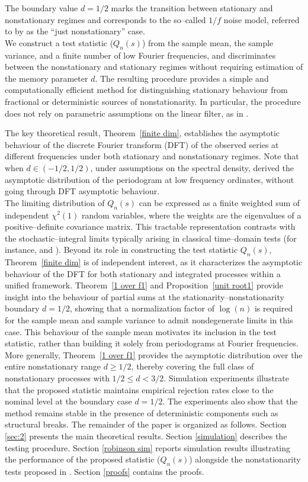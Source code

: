 \documentclass[10pt,a4paper]{amsart}
\numberwithin{equation}{section}
\begin{document}
The boundary value $d=1/2$ marks the transition between stationary and nonstationary regimes and corresponds to the so--called $1/f$ noise model, referred to by \cite{Robinson} as the ``just nonstationary'' case.\\
We construct a test statistic ($Q_n(s)$) from the sample mean, the sample variance, and a finite number of low Fourier frequencies, and discriminates between the nonstationary and stationary regimes without requiring estimation of the memory parameter $d$. The resulting procedure provides a simple and computationally efficient method for distinguishing stationary behaviour from fractional or deterministic sources of nonstationarity. In particular, the procedure does not rely on parametric assumptions on the linear filter, as in \cite{Robinson}. 

The key theoretical result, Theorem~\ref{finite dim}, establishes the asymptotic behaviour of the discrete Fourier transform (DFT)  of the observed series at different frequencies under both stationary and nonstationary regimes.
Note that when \(d\in(-1/2,1/2)\), under assumptions on the spectral density, \cite{MR1307342} derived the asymptotic distribution of the periodogram at low frequency ordinates, without going through DFT asymptotic behaviour.\\
 The limiting distribution of $Q_n(s)$ can be expressed as a finite weighted sum of independent $\chi^2(1)$ random variables, where the weights are the eigenvalues of a positive--definite covariance matrix. This tractable representation contrasts with the stochastic--integral limits typically arising in classical time--domain tests (for instance, \cite{DickeyFuller1979} and  \cite{MR2328526}).
Beyond its role in constructing the test statistic $Q_n(s)$, Theorem~\ref{finite dim} is of independent interest, as it characterizes the asymptotic behaviour of the DFT for both stationary and integrated processes within a unified framework.
Theorem~\ref{1 over f1} and Proposition~\ref{unit root1} provide insight into the behaviour of partial sums at the stationarity--nonstationarity boundary $d=1/2$, showing that a normalization factor of $\log(n)$ is required for the sample mean and sample variance to admit nondegenerate limits in this case. This behaviour of the sample mean motivates its inclusion in the test statistic, rather than building it solely from periodograms at Fourier frequencies.
More generally, Theorem~\ref{1 over f1} provides the asymptotic distribution over the entire nonstationary range $d \ge 1/2$, thereby covering the full class of nonstationary processes with $1/2\le d<3/2$.
Simulation experiments illustrate that the proposed statistic maintains empirical rejection rates close to the nominal level at the boundary case \(d=1/2\). The experiments also show that the method remains stable in the presence of deterministic components such as structural breaks.
The remainder of the paper is organized as follows. Section \ref{sec:2} presents the main theoretical results. Section \ref{simulation} describes the testing procedure. Section \ref{robinson sim} reports simulation results illustrating the performance of the proposed statistic ($Q_n(s)$) alongside the nonstationarity tests proposed in \cite{Robinson}.
Section \ref{proofs} contains the proofs.
\end{document}

